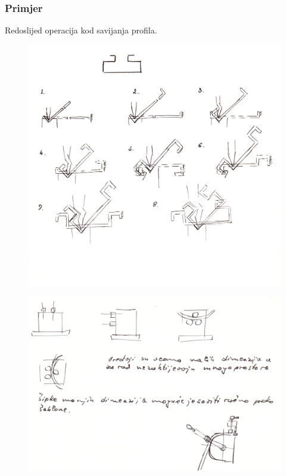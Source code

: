 \documentclass[a4paper,12pt]{article}
\numberwithin{figure}{section}
\begin{document}
\subsubsection*{Primjer}
Redoslijed operacija kod savijanja profila.
\begin{figure}[!h]
\centering
\includegraphics[scale=0.15]{image_50.png}
\end{figure}
\FloatBarrier
\clearpage
\begin{figure}[!h]
\centering
\includegraphics[scale=0.14]{image_51-1.png}
\end{figure}
\FloatBarrier
\end{document}
